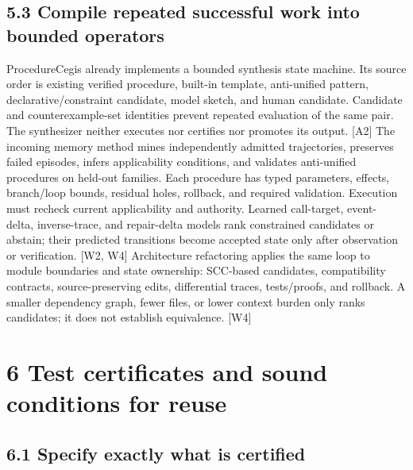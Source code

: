 \documentclass{article}
\begin{document}
\subsection*{5.3 Compile repeated successful work into bounded operators}

ProcedureCegis already implements a bounded synthesis state machine. Its source order is existing
verified procedure, built-in template, anti-unified pattern, declarative/constraint candidate, model
sketch, and human candidate. Candidate and counterexample-set identities prevent repeated evaluation
of the same pair. The synthesizer neither executes nor certifies nor promotes its output. [A2]
The incoming memory method mines independently admitted trajectories, preserves failed episodes,
infers applicability conditions, and validates anti-unified procedures on held-out families. Each
procedure has typed parameters, effects, branch/loop bounds, residual holes, rollback, and required
validation. Execution must recheck current applicability and authority. Learned call-target, event-
delta, inverse-trace, and repair-delta models rank constrained candidates or abstain; their predicted
transitions become accepted state only after observation or verification. [W2, W4]
Architecture refactoring applies the same loop to module boundaries and state ownership: SCC-based
candidates, compatibility contracts, source-preserving edits, differential traces, tests/proofs, and
rollback. A smaller dependency graph, fewer files, or lower context burden only ranks candidates; it
does not establish equivalence. [W4]


\section*{6 Test certificates and sound conditions for reuse}

\subsection*{6.1 Specify exactly what is certified}
\end{document}
